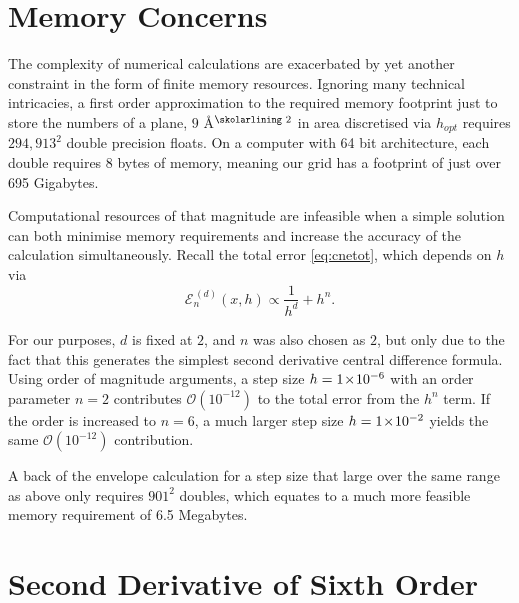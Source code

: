 \section{Memory Concerns}\label{sec:memcons}

The complexity of numerical calculations are exacerbated by yet another constraint in the form of finite memory resources.
Ignoring many technical intricacies, a first order approximation to the required memory footprint just to store the numbers of a  plane, $9$ Å$^\text{\skolarlining 2}$ in area discretised via $h_{opt}$ requires $294,913^2$ double precision floats.
On a computer with 64 bit architecture, each double requires 8 bytes of memory, meaning our grid has a footprint of just over 695 Gigabytes.

Computational resources of that magnitude are infeasible when a simple solution can both minimise memory requirements and increase the accuracy of the calculation simultaneously.
Recall the total error \cref{eq:cnetot}, which depends on $h$ via
\begin{equation}
\mathcal{E}_n^{\,(d)}(x,h) \propto \frac{1}{h^d} + h^n.
\end{equation}

For our purposes, $d$ is fixed at $2$, and $n$ was also chosen as $2$, but only due to the fact that this generates the simplest second derivative central difference formula.
Using order of magnitude arguments, a step size $h = 1\!\times\!10^{-6}$ with an order parameter $n = 2$ contributes $\mathcal{O}(10^{-12})$ to the total error from the $h^n$ term.
If the order is increased to $n = 6$, a much larger step size $h = 1\!\times\!10^{-2}$ yields the same $\mathcal{O}(10^{-12})$ contribution.

A back of the envelope calculation for a step size that large over the same range as above only requires $901^2$ doubles, which equates to a much more feasible memory requirement of 6.5 Megabytes.

\section{Second Derivative of Sixth Order}\label{sec:cd6o}

